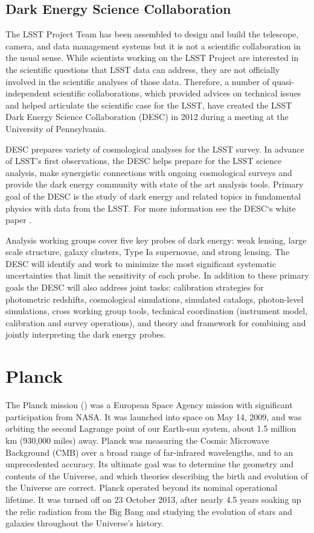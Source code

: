 \subsection{Dark Energy Science Collaboration}
The LSST Project Team has been assembled to design and build the telescope, camera, and data management systems but it is not a scientific collaboration in the usual sense. While scientists working on the LSST Project are interested in the scientific questions that LSST data can address, they are not officially involved in the scientific analyses of those data. Therefore, a number of quasi-independent scientific collaborations, which provided advices on technical issues and helped articulate the scientific case for the LSST, have created the LSST Dark Energy Science Collaboration (DESC) in 2012 during a meeting at the University of Pennsylvania.

DESC prepares variety of cosmological analyses for the LSST survey. In advance of LSST's first observations, the DESC helps prepare for the LSST science analysis, make synergistic connections with ongoing cosmological surveys and provide the dark energy community with state of the art analysis tools. Primary goal of the DESC is the study of dark energy and related topics in fundamental physics with data from the LSST. For more information see the DESC`s white paper \cite{desc_white}.

Analysis working groups cover five key probes of dark energy: weak lensing, large scale structure, galaxy clusters, Type Ia supernovae, and strong lensing. The DESC will identify and work to minimize the most significant systematic uncertainties that limit the sensitivity of each probe. In addition to these primary goals the DESC will also address joint tasks: calibration strategies for photometric redshifts, cosmological simulations, simulated catalogs, photon-level simulations, cross working group tools, technical coordination (instrument model, calibration and survey operations), and theory and framework for combining and jointly interpreting the dark energy probes.

\section{Planck}

The Planck mission (\cite{planck}) was a European Space Agency mission with significant participation from NASA. It was launched into space on May 14, 2009, and was orbiting the second Lagrange point of our Earth-sun system, about 1.5 million km (930,000 miles) away. Planck was measuring the Cosmic Microwave Background (CMB) over a broad range of far-infrared wavelengths, and to an unprecedented accuracy. Its ultimate goal was to determine the geometry and contents of the Universe, and which theories describing the birth and evolution of the Universe are correct. Planck operated beyond its nominal operational lifetime. It was turned off on 23 October 2013, after nearly 4.5 years soaking up the relic radiation from the Big Bang and studying the evolution of stars and galaxies throughout the Universe's history.

